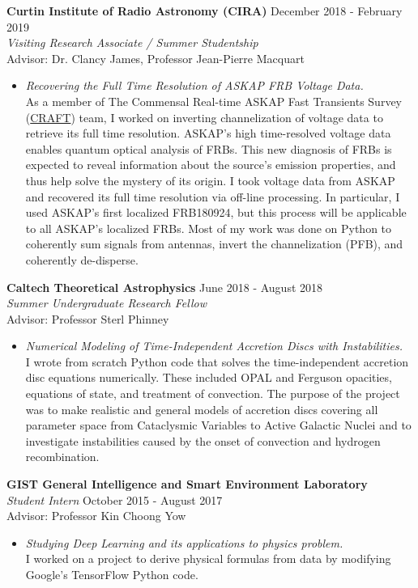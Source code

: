 \documentclass[margin, 10pt]{res} %
\begin{document}
\begin{resume}
{\bf Curtin Institute of Radio Astronomy (CIRA)} \hfill December 2018 - February 2019 \\
{\sl Visiting Research Associate / Summer Studentship} \\
Advisor: Dr. Clancy James, Professor Jean-Pierre Macquart
\begin{itemize}
\item[] {\sl Recovering the Full Time Resolution of ASKAP FRB Voltage Data.}\\
As a member of The Commensal Real-time ASKAP Fast Transients Survey (\href{http://astronomy.curtin.edu.au/research/craft/}{CRAFT}) team, I worked on inverting channelization of voltage data to retrieve its full time resolution. ASKAP's high time-resolved voltage data enables quantum optical analysis of FRBs. This new diagnosis of FRBs is expected to reveal information about the source's emission properties, and thus help solve the mystery of its origin. I took voltage data from ASKAP and recovered its full time resolution via off-line processing. In particular, I used ASKAP's first localized FRB180924, but this process will be applicable to all ASKAP's localized FRBs. Most of my work was done on Python to coherently sum signals from antennas, invert the channelization (PFB), and coherently de-disperse.
\end{itemize} 

{\bf Caltech Theoretical Astrophysics} \hfill June 2018 - August 2018 \\
{\sl Summer Undergraduate Research Fellow} \\
Advisor: Professor Sterl Phinney
\begin{itemize}
\item[] {\sl Numerical Modeling of Time-Independent Accretion Discs with Instabilities.}\\
I wrote from scratch Python code that solves the time-independent accretion disc equations numerically. These included OPAL and Ferguson opacities, equations of state, and treatment of convection. The purpose of the project was to make realistic and general models of accretion discs covering all parameter space from Cataclysmic Variables to Active Galactic Nuclei and to investigate instabilities caused by the onset of convection and hydrogen recombination.
\end{itemize} 

{\bf GIST General Intelligence and Smart Environment Laboratory}\\
{\sl Student Intern} \hfill October 2015 - August 2017 \\
Advisor: Professor Kin Choong Yow
\begin{itemize}
\item[] {\sl Studying Deep Learning and its applications to physics problem.}\\
I worked on a project to derive physical formulas from data by modifying Google's TensorFlow Python code.
\end{itemize} 


\end{resume}
\end{document}
